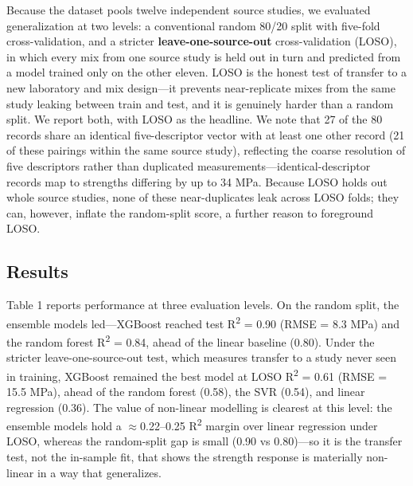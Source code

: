 \documentclass[materials,article,submit,pdftex,moreauthors]{Definitions/mdpi}
\begin{document}
Because the dataset pools twelve independent source studies, we evaluated generalization at two levels: a conventional random 80/20 split with five-fold cross-validation, and a stricter \textbf{leave-one-source-out} cross-validation (LOSO), in which every mix from one source study is held out in turn and predicted from a model trained only on the other eleven. LOSO is the honest test of transfer to a new laboratory and mix design---it prevents near-replicate mixes from the same study leaking between train and test, and it is genuinely harder than a random split. We report both, with LOSO as the headline. We note that 27 of the 80 records share an identical five-descriptor vector with at least one other record (21 of these pairings within the same source study), reflecting the coarse resolution of five descriptors rather than duplicated measurements---identical-descriptor records map to strengths differing by up to 34 MPa. Because LOSO holds out whole source studies, none of these near-duplicates leak across LOSO folds; they can, however, inflate the random-split score, a further reason to foreground LOSO.

\subsection{Results}

Table 1 reports performance at three evaluation levels. On the random split, the ensemble models led---XGBoost reached test R\textsuperscript{2} = 0.90 (RMSE = 8.3 MPa) and the random forest R\textsuperscript{2} = 0.84, ahead of the linear baseline (0.80). Under the stricter leave-one-source-out test, which measures transfer to a study never seen in training, XGBoost remained the best model at LOSO R\textsuperscript{2} = 0.61 (RMSE = 15.5 MPa), ahead of the random forest (0.58), the SVR (0.54), and linear regression (0.36). The value of non-linear modelling is clearest at this level: the ensemble models hold a $\approx$0.22--0.25 R\textsuperscript{2} margin over linear regression under LOSO, whereas the random-split gap is small (0.90 vs 0.80)---so it is the transfer test, not the in-sample fit, that shows the strength response is materially non-linear in a way that generalizes.
\end{document}
